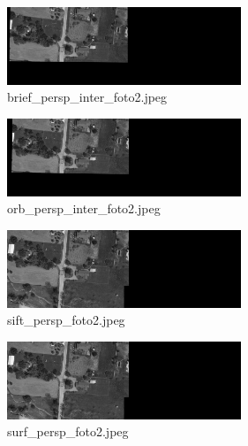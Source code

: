 \documentclass[twoside,twocolumn]{article}
\begin{document}
\begin{figure}[H]
\begin{center}
	\includegraphics[width=7cm]{figures/brief_persp_inter_foto2.jpeg}
\caption{brief\_persp\_inter\_foto2.jpeg} \label{brief_persp_inter_foto2}
\end{center}
\end{figure}

\begin{figure}[H]
\begin{center}
	\includegraphics[width=7cm]{figures/orb_persp_inter_foto2.jpeg}
\caption{orb\_persp\_inter\_foto2.jpeg} \label{orb_persp_inter_foto2}
\end{center}
\end{figure}

\begin{figure}[H]
\begin{center}
	\includegraphics[width=7cm]{figures/sift_persp_foto2.jpeg}
\caption{sift\_persp\_foto2.jpeg} \label{sift_persp_foto2}
\end{center}
\end{figure}

\begin{figure}[H]
\begin{center}
	\includegraphics[width=7cm]{figures/surf_persp_foto2.jpeg}
\caption{surf\_persp\_foto2.jpeg} \label{surf_persp_foto2}
\end{center}
\end{figure}
\end{document}
